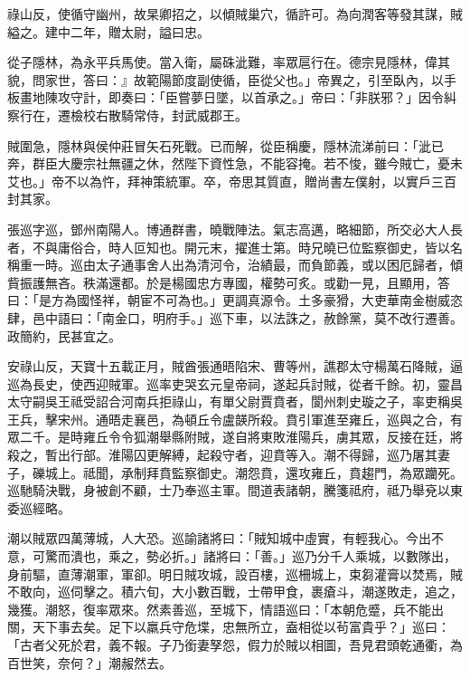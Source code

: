 \begin{pinyinscope}
 祿山反，使循守幽州，故杲卿招之，以傾賊巢穴，循許可。為向潤客等發其謀，賊縊之。建中二年，贈太尉，謚曰忠。



 從子隱林，為永平兵馬使。當入衛，屬硃泚難，率眾扈行在。德宗見隱林，偉其貌，問家世，答曰：』故範陽節度副使循，臣從父也。」帝異之，引至臥內，以手板畫地陳攻守計，即奏曰：「臣嘗夢日墜，以首承之。」帝曰：「非朕邪？」因令糾察行在，遷檢校右散騎常侍，封武威郡王。



 賊圍急，隱林與侯仲莊冒矢石死戰。已而解，從臣稱慶，隱林流涕前曰：「泚已奔，群臣大慶宗社無疆之休，然陛下資性急，不能容掩。若不悛，雖今賊亡，憂未艾也。」帝不以為忤，拜神策統軍。卒，帝思其質直，贈尚書左僕射，以實戶三百封其家。



 張巡字巡，鄧州南陽人。博通群書，曉戰陣法。氣志高邁，略細節，所交必大人長者，不與庸俗合，時人叵知也。開元末，擢進士第。時兄曉已位監察御史，皆以名稱重一時。巡由太子通事舍人出為清河令，治績最，而負節義，或以困厄歸者，傾貲振護無吝。秩滿還都。於是楊國忠方專國，權勢可炙。或勸一見，且顯用，答曰：「是方為國怪祥，朝宦不可為也。」更調真源令。土多豪猾，大吏華南金樹威恣肆，邑中語曰：「南金口，明府手。」巡下車，以法誅之，赦餘黨，莫不改行遷善。政簡約，民甚宜之。



 安祿山反，天寶十五載正月，賊酋張通晤陷宋、曹等州，譙郡太守楊萬石降賊，逼巡為長史，使西迎賊軍。巡率吏哭玄元皇帝祠，遂起兵討賊，從者千餘。初，靈昌太守嗣吳王祗受詔合河南兵拒祿山，有單父尉賈賁者，閬州刺史璇之子，率吏稱吳王兵，擊宋州。通晤走襄邑，為頓丘令盧韺所殺。賁引軍進至雍丘，巡與之合，有眾二千。是時雍丘令令狐潮舉縣附賊，遂自將東敗淮陽兵，虜其眾，反接在廷，將殺之，暫出行部。淮陽囚更解縛，起殺守者，迎賁等入。潮不得歸，巡乃屠其妻子，礫城上。祗聞，承制拜賁監察御史。潮怨賁，還攻雍丘，賁趨門，為眾躪死。巡馳騎決戰，身被創不顧，士乃奉巡主軍。間道表諸朝，騰箋祗府，祗乃舉兗以東委巡經略。



 潮以賊眾四萬薄城，人大恐。巡諭諸將曰：「賊知城中虛實，有輕我心。今出不意，可驚而潰也，乘之，勢必折。」諸將曰：「善。」巡乃分千人乘城，以數隊出，身前驅，直薄潮軍，軍卻。明日賊攻城，設百樓，巡柵城上，束芻灌膏以焚焉，賊不敢向，巡伺擊之。積六旬，大小數百戰，士帶甲食，裹瘡斗，潮遂敗走，追之，幾獲。潮怒，復率眾來。然素善巡，至城下，情語巡曰：「本朝危蹙，兵不能出關，天下事去矣。足下以羸兵守危堞，忠無所立，盍相從以茍富貴乎？」巡曰：「古者父死於君，義不報。子乃銜妻孥怨，假力於賊以相圖，吾見君頭乾通衢，為百世笑，奈何？」潮赧然去。




\end{pinyinscope}
